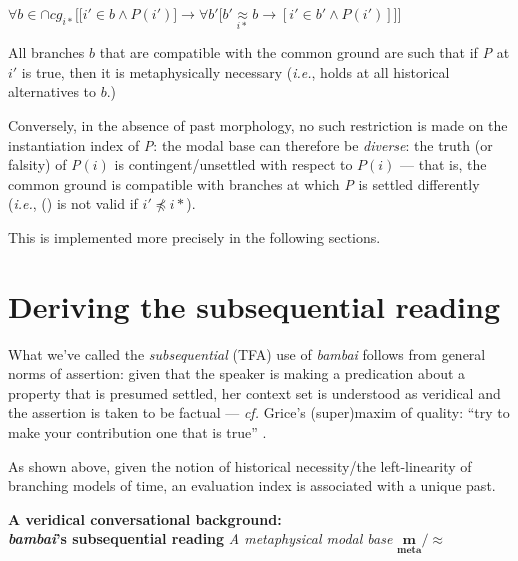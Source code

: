 $ \forall b\in\cap\textit{cg}_{i*}\Big[\big[ i'\in b\wedge\textit{P}(i')\big]\to\forall b'\big[b'\underset{i*}{\approx} b\to[i'\in b'\wedge\textit{P}(i')]\big]\Big]$

All branches $ b $ that are compatible with the common ground are such that if \textit{P} at $ i' $ is true, then it is metaphysically necessary (\textit{i.e.}, holds at all historical alternatives to $ b $.)
\xe

Conversely, in the absence of past morphology, no such restriction is made on the instantiation index of \textit{P}: the modal base can therefore be \textit{diverse}: the truth (or falsity) of \textit{P$ (i) $} is contingent/unsettled with respect to $ P(i) $ --- that is, the common ground is compatible with branches at which \textit{P} is settled differently (\textit{i.e.}, (\lastx) is not valid if $ i'\not\preccurlyeq i* $).%


This is implemented more precisely in the following sections.

\section{Deriving the subsequential reading}
What we've called the \textit{subsequential} (TFA) use of \textit{bambai} follows from general norms of assertion: given that the speaker is making a predication about a property that is presumed settled, her context set is understood as veridical and the assertion is taken to be factual --- \textit{cf.} Grice's (super)maxim of quality: ``try to make your contribution one that is true'' \citeyearpar[27]{Grice1991}.


As shown above, given the notion of historical necessity/the left-linearity of branching models of time, an evaluation index is associated with a unique past.


\pex \textbf{A veridical conversational background:\\ \textit{bambai}'s subsequential reading}
\a \textit{A metaphysical modal base} $ \boldsymbol{\underset{\text{meta}}{m}/\approx }$

